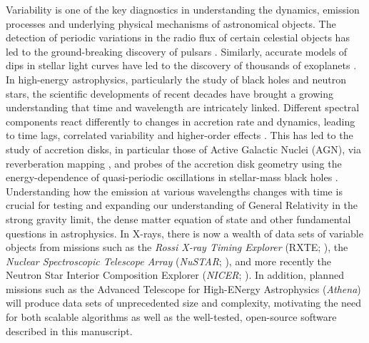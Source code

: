 \documentclass[twocolumn]{aastex62}
\newcommand{\project}[1]{\textsl{#1}\xspace}
\newcommand{\nustar}{\project{NuSTAR}\xspace}
\begin{document}
Variability is one of the key diagnostics in understanding the dynamics, emission processes and underlying physical mechanisms of astronomical objects. 
The detection of periodic variations in the radio flux of certain celestial objects has led to the ground-breaking discovery of pulsars \citep{hewish1968}. Similarly, accurate models of dips in stellar light curves have led to the discovery of thousands of exoplanets \citep[e.g.]{charbonneau2000,henry2000,coughlin2016}. 
In high-energy astrophysics, particularly the study of black holes and neutron stars, the scientific developments of recent decades have brought a growing understanding that time and wavelength are intricately linked. 
Different spectral components react differently to changes in accretion rate and dynamics, leading to time lags, correlated variability and higher-order effects \citep[for a review, see e.g.][]{uttley2014}. 
This has led to the study of accretion disks, in particular those of Active Galactic Nuclei (AGN), via reverberation mapping \citep[e.g.][]{blandford_reverberation_1982,Bentz2016}, and probes of the accretion disk geometry using the energy-dependence of quasi-periodic oscillations in stellar-mass black holes \citep{ingram2015,ingram2016}. 
Understanding how the emission at various wavelengths changes with time is crucial for testing and expanding our understanding of General Relativity in the strong gravity limit, the dense matter equation of state and other fundamental questions in astrophysics.
In X-rays, there is now a wealth of data sets of variable objects from missions such as the \textit{Rossi X-ray Timing Explorer}  (RXTE; \citealt{Bradtetal93}), the \textit{Nuclear Spectroscopic Telescope Array} (\nustar; \citealt{nustar13}), and more recently the Neutron Star Interior Composition Explorer (\textit{NICER}; \citealt{gendreau2016}). In addition, planned missions such as the Advanced Telescope for High-ENergy Astrophysics (\textit{Athena}) will produce data sets of unprecedented size and complexity, motivating the need for both scalable algorithms as well as the well-tested, open-source software described in this manuscript.
\end{document}
